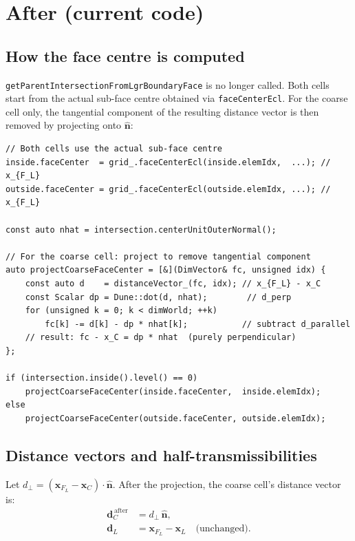 \documentclass[11pt,a4paper]{article}
\begin{document}
\section*{After (current code)}

\subsection*{How the face centre is computed}

\texttt{getParentIntersectionFromLgrBoundaryFace} is no longer called.
Both cells start from the actual sub-face centre obtained via
\texttt{faceCenterEcl}.  For the coarse cell only, the tangential
component of the resulting distance vector is then removed by
projecting onto $\hat{\mathbf{n}}$:

\begin{lstlisting}
// Both cells use the actual sub-face centre
inside.faceCenter  = grid_.faceCenterEcl(inside.elemIdx,  ...); // x_{F_L}
outside.faceCenter = grid_.faceCenterEcl(outside.elemIdx, ...); // x_{F_L}

const auto nhat = intersection.centerUnitOuterNormal();

// For the coarse cell: project to remove tangential component
auto projectCoarseFaceCenter = [&](DimVector& fc, unsigned idx) {
    const auto d    = distanceVector_(fc, idx); // x_{F_L} - x_C
    const Scalar dp = Dune::dot(d, nhat);        // d_perp
    for (unsigned k = 0; k < dimWorld; ++k)
        fc[k] -= d[k] - dp * nhat[k];           // subtract d_parallel
    // result: fc - x_C = dp * nhat  (purely perpendicular)
};

if (intersection.inside().level() == 0)
    projectCoarseFaceCenter(inside.faceCenter,  inside.elemIdx);
else
    projectCoarseFaceCenter(outside.faceCenter, outside.elemIdx);
\end{lstlisting}

\subsection*{Distance vectors and half-transmissibilities}

Let $d_\perp = (\mathbf{x}_{F_L} - \mathbf{x}_C)\cdot\hat{\mathbf{n}}$.
After the projection, the coarse cell's distance vector is:
\begin{align}
  \mathbf{d}_C^{\,\text{after}} &= d_\perp\,\hat{\mathbf{n}},
  \label{eq:dC_after}\\[6pt]
  \mathbf{d}_L &= \mathbf{x}_{F_L} - \mathbf{x}_L
  \quad\text{(unchanged)}.
\end{align}
\end{document}
